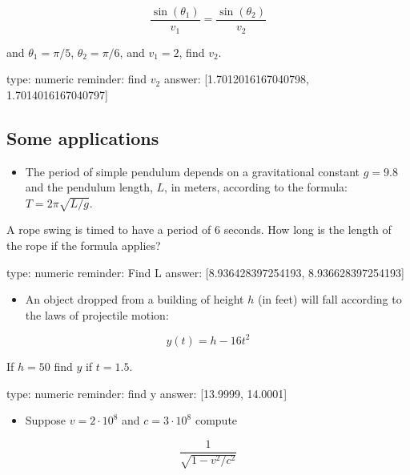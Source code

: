 \documentclass[12pt]{article}
\begin{document}
\[
\frac{\sin(\theta_1)}{v_1} = \frac{\sin(\theta_2)}{v_2}
\]

and $\theta_1 = \pi/5$, $\theta_2 = \pi/6$, and $v_1=2$, find $v_2$.

\begin{answer}
    type: numeric
    reminder: find \(v_2\)
    answer: [1.7012016167040798, 1.7014016167040797]

\end{answer}

\subsection{Some applications}

\begin{itemize}
\itemsep1pt\parskip0pt
\item
  The period of simple pendulum depends on a gravitational constant
  $g=9.8$ and the pendulum length, $L$, in meters, according to the
  formula: $T=2\pi\sqrt{L/g}$.
\end{itemize}

A rope swing is timed to have a period of $6$ seconds. How long is the
length of the rope if the formula applies?

\begin{answer}
    type: numeric
    reminder: Find L
    answer: [8.936428397254193, 8.936628397254193]

\end{answer}

\begin{itemize}
\itemsep1pt\parskip0pt
\item
  An object dropped from a building of height $h$ (in feet) will fall
  according to the laws of projectile motion:
\end{itemize}

\[
y(t) = h - 16t^2
\]

If $h=50$ find $y$ if $t=1.5$.

\begin{answer}
    type: numeric
    reminder: find y
    answer: [13.9999, 14.0001]

\end{answer}

\begin{itemize}
\itemsep1pt\parskip0pt
\item
  Suppose $v = 2\cdot 10^8$ and $c = 3 \cdot 10^8$ compute
\end{itemize}

\[
\frac{1}{\sqrt{1 - v^2/c^2}}
\]
\end{document}
